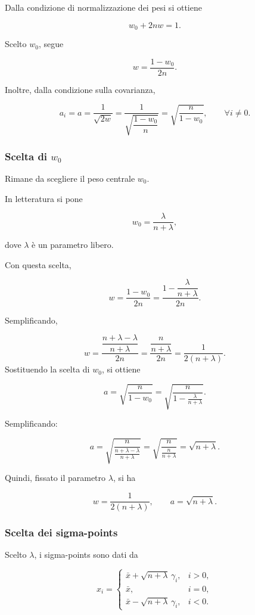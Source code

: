 \documentclass[11pt,a4paper]{article}
\begin{document}
Dalla condizione di normalizzazione dei pesi si ottiene

\[
w_0+2nw=1.
\]

Scelto \(w_0\), segue

\[
w=\frac{1-w_0}{2n}.
\]

Inoltre, dalla condizione sulla covarianza,

\[
a_i=a=\frac{1}{\sqrt{2w}}
=
\frac{1}{\sqrt{\dfrac{1-w_0}{n}}}
=
\sqrt{\frac{n}{1-w_0}},
\qquad \forall i\neq 0.
\]

\subsubsection*{Scelta di \(w_0\)}

Rimane da scegliere il peso centrale \(w_0\).

In letteratura si pone

\[
w_0=\frac{\lambda}{n+\lambda},
\]

dove \(\lambda\) è un parametro libero.

Con questa scelta,

\[
w
=
\frac{1-w_0}{2n}
=
\frac{1-\dfrac{\lambda}{n+\lambda}}{2n}.
\]

Semplificando,

\[
w
=
\frac{\dfrac{n+\lambda-\lambda}{n+\lambda}}{2n}
=
\frac{\dfrac{n}{n+\lambda}}{2n}
=
\frac{1}{2(n+\lambda)}.
\]
Sostituendo la scelta di \(w_0\), si ottiene

\[
a
=
\sqrt{\frac{n}{1-w_0}}
=
\sqrt{
\frac{n}{1-\frac{\lambda}{n+\lambda}}
}.
\]

Semplificando:

\[
a
=
\sqrt{
\frac{n}{\frac{n+\lambda-\lambda}{n+\lambda}}
}
=
\sqrt{
\frac{n}{\frac{n}{n+\lambda}}
}
=
\sqrt{n+\lambda}.
\]

Quindi, fissato il parametro \(\lambda\), si ha

\[
w=\frac{1}{2(n+\lambda)},
\qquad
a=\sqrt{n+\lambda}.
\]

\subsubsection*{Scelta dei sigma-points}

Scelto \(\lambda\), i sigma-points sono dati da

\[
x_i=
\begin{cases}
\bar x+\sqrt{n+\lambda}\,\gamma_i, & i>0,\\[0.4em]
\bar x, & i=0,\\[0.4em]
\bar x-\sqrt{n+\lambda}\,\gamma_i, & i<0.
\end{cases}
\]
\end{document}
